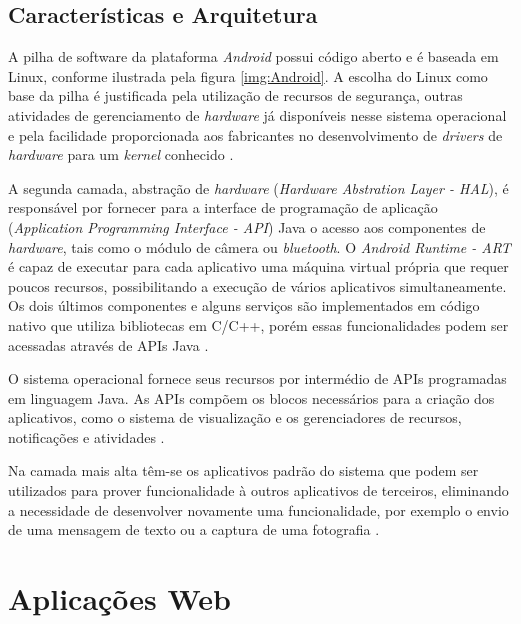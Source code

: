 \subsection{Características e Arquitetura}

A pilha de software da plataforma \textit{Android} possui código aberto e é baseada em Linux, conforme ilustrada pela figura \ref{img:Android}. A escolha do Linux como base da pilha é justificada pela utilização de recursos de segurança, outras atividades de gerenciamento de \textit{hardware} já disponíveis nesse sistema operacional e pela facilidade proporcionada aos fabricantes no desenvolvimento de \textit{drivers} de \textit{hardware} para um \textit{kernel} conhecido \cite{SITEANDROID, gandhewar2010google}.


A segunda camada, abstração de \textit{hardware} (\textit{Hardware Abstration Layer - HAL}), é responsável por fornecer para a interface de programação de aplicação (\textit{Application Programming Interface - API}) Java o acesso aos componentes de \textit{hardware}, tais como o módulo de câmera ou \textit{bluetooth}. O \textit{Android Runtime - ART} é capaz de executar para cada aplicativo uma máquina virtual própria que requer poucos recursos, possibilitando a execução de vários aplicativos simultaneamente. Os dois últimos componentes e alguns serviços são implementados em código nativo que utiliza bibliotecas em C/C++, porém essas funcionalidades podem ser acessadas através de APIs Java \cite{SITEANDROID}.

O sistema operacional fornece seus recursos por intermédio de APIs programadas em linguagem Java. As APIs compõem os blocos necessários para a criação dos aplicativos, como o sistema de visualização e os gerenciadores de recursos, notificações e atividades \cite{SITEANDROID}.

Na camada mais alta têm-se os aplicativos padrão do sistema que podem ser utilizados para prover funcionalidade à outros aplicativos de terceiros, eliminando a necessidade de desenvolver novamente uma funcionalidade, por exemplo o envio de uma mensagem de texto ou a captura de uma fotografia \cite{SITEANDROID, saha2008developer}.

\section{Aplicações Web}

